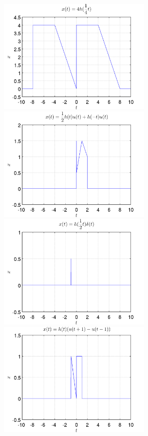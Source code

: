 \documentclass[a4paper,12pt,final]{article}
\begin{document}
\begin{figure}[H]
        \vspace{0.7em}
        \vspace{0.1em}
        \includegraphics[width=3in]{./laboratorio_2/problema07_d.png}
        \includegraphics[width=3in]{./laboratorio_2/problema07_e.png}
        \vspace{0.7em}
        \vspace{0.1em}
        \includegraphics[width=3in]{./laboratorio_2/problema07_f.png}
        \includegraphics[width=3in]{./laboratorio_2/problema07_g.png}
      \end{figure}
\end{document}
